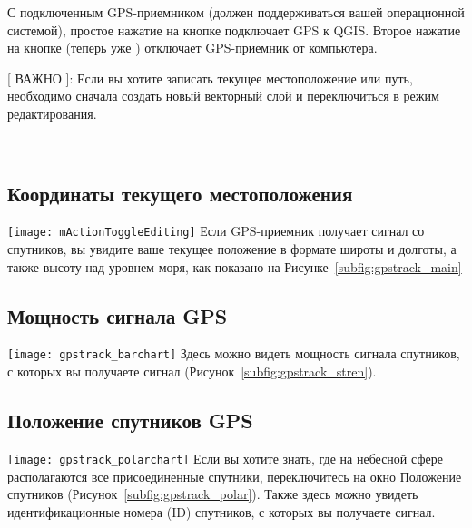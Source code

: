 С подключенным GPS-приемником (должен поддерживаться вашей операционной
системой), простое нажатие на кнопке  подключает
GPS к QGIS. Второе нажатие на кнопке (теперь уже )
отключает GPS-приемник от компьютера.

[ ВАЖНО ]: Если вы хотите записать текущее местоположение или путь,
необходимо сначала создать новый векторный слой и переключиться в режим
редактирования.

\begin{figure}[ht]
\centering
     \hspace{0.33cm}
     \hspace{0.33cm}
    \\
\end{figure}

\subsection{Координаты текущего местоположения}
\texttt{[image: mActionToggleEditing]} Если GPS-приемник
получает сигнал со спутников, вы увидите ваше текущее положение в формате широты
и долготы, а также высоту над уровнем моря, как показано на
Рисунке~\ref{subfig:gpstrack_main}

\subsection{Мощность сигнала GPS}
\texttt{[image: gpstrack\_barchart]} Здесь можно
видеть мощность сигнала спутников, с которых вы получаете сигнал
(Рисунок~\ref{subfig:gpstrack_stren}).

\subsection{Положение спутников GPS}
\texttt{[image: gpstrack\_polarchart]} Если вы
хотите знать, где на небесной сфере располагаются все присоединенные спутники,
переключитесь на окно Положение спутников
(Рисунок~\ref{subfig:gpstrack_polar}). Также здесь можно увидеть
идентификационные номера (ID) спутников, с которых вы получаете сигнал.

